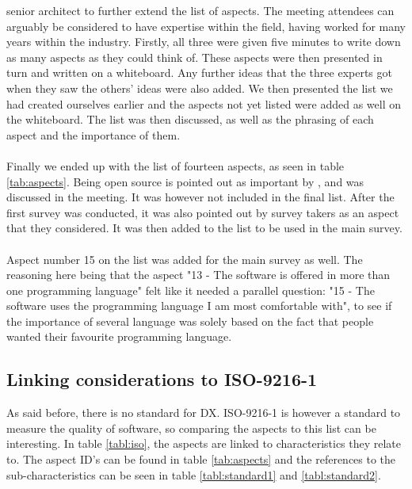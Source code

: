 \documentclass{article}
\begin{document}
senior architect to further extend the list of aspects. The meeting attendees can arguably be considered
to have expertise within the field, having worked for many years within the industry.
Firstly, all three
were given five minutes to write down as many aspects as they could think of.
These aspects were then presented in turn and written on a whiteboard. Any further ideas
that the three experts got when they saw the others' ideas were also added.
We then presented the list we had created ourselves earlier and the aspects not yet listed were added
as well on the whiteboard. The list was then discussed, as well as the phrasing of each aspect and the importance
of them.
\\ \\
Finally we ended up with the list of fourteen aspects, as seen in table \ref{tab:aspects}.
Being open source is pointed out as important by \cite{jarman}, and was discussed in the meeting.
It was however not included in the final list. After the first survey was conducted, it was
also pointed out by survey takers as an aspect that they considered. It was then
added to the list to be used in the main survey.
\\ \\
Aspect number 15 on the list was
added for the main survey as well. The reasoning here being that the aspect
"13 - The software is offered in more than one programming language" felt
like it needed a parallel question: "15 - The software uses the programming language I am most comfortable with",
to see if the importance of several language was solely based on the fact that
people wanted their favourite programming language.


\subsection{Linking considerations to ISO-9216-1}

As said before, there is no standard for DX. ISO-9216-1 is however a standard
to measure the quality of software, so comparing the aspects to this list can
be interesting. In table \ref{tabl:iso}, the aspects are linked to characteristics they relate to. The aspect ID's can
be found in table \ref{tab:aspects} and the references to the sub-characteristics can be seen in table \ref{tabl:standard1} and \ref{tabl:standard2}.
\end{document}
